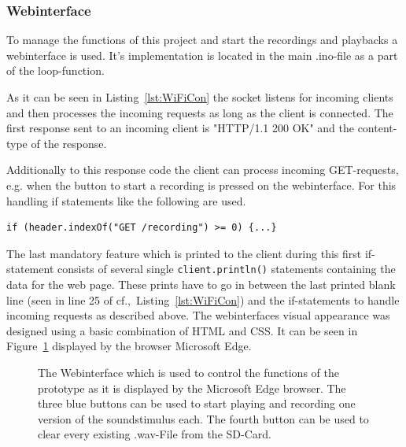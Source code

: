 \subsubsection{Webinterface}
To manage the functions of this project and start the recordings and playbacks a webinterface is used.
It's implementation is located in the main .ino-file as a part of the loop-function.

As it can be seen in Listing~\ref{lst:WiFiCon} the socket listens for incoming clients and then processes the incoming requests as long as the client is connected.
The first response sent to an incoming client is "HTTP/1.1 200 OK" and the content-type of the response.

Additionally to this response code the client can process incoming GET-requests, e.g. when the button to start a recording is pressed on the webinterface.
For this handling if statements like the following are used.
\begin{lstlisting}[style=inText] 
	if (header.indexOf("GET /recording") >= 0) {...}  
\end{lstlisting}
The last mandatory feature which is printed to the client during this first if-statement consists of several single \texttt{client.println()} statements containing the data for the web page.
These prints have to go in between the last printed blank line (seen in line 25 of cf.,~Listing~\ref{lst:WiFiCon}) and the if-statements to handle incoming requests as described above.
The webinterfaces visual appearance was designed using a basic combination of HTML and CSS.
It can be seen in Figure~\ref{fig:webinterface} displayed by the browser Microsoft Edge.

\begin{figure}
	\caption{The Webinterface which is used to control the functions of the prototype as it is displayed by the Microsoft Edge browser. The three blue buttons can be used to start playing and recording one version of the soundstimulus each. The fourth button can be used to clear every existing .wav-File from the SD-Card.}
	\label{fig:webinterface}
\end{figure}

